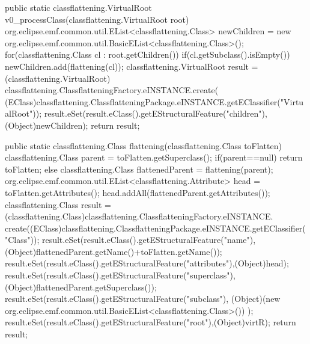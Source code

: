 \begin{codesource2}[label=code:v0flattening,caption=Implémentation de la transformation d'aplatissement de hiérarchie de classes en Java]
public static classflattening.VirtualRoot v0_processClass(classflattening.VirtualRoot root) {
  org.eclipse.emf.common.util.EList<classflattening.Class> newChildren =
    new org.eclipse.emf.common.util.BasicEList<classflattening.Class>();
  for(classflattening.Class cl : root.getChildren()) {
    if(cl.getSubclass().isEmpty()) {
      newChildren.add(flattening(cl));
    }
  }
  classflattening.VirtualRoot result = (classflattening.VirtualRoot)
    classflattening.ClassflatteningFactory.eINSTANCE.create(
        (EClass)classflattening.ClassflatteningPackage.eINSTANCE.getEClassifier("VirtualRoot"));
  result.eSet(result.eClass().getEStructuralFeature("children"),(Object)newChildren);
  return result;
}

public static classflattening.Class flattening(classflattening.Class toFlatten) {
  classflattening.Class parent = toFlatten.getSuperclass();
  if(parent==null) {
    return toFlatten;
  } else {
    classflattening.Class flattenedParent = flattening(parent);
    org.eclipse.emf.common.util.EList<classflattening.Attribute> head =
      toFlatten.getAttributes();
    head.addAll(flattenedParent.getAttributes());
    classflattening.Class result = (classflattening.Class)classflattening.ClassflatteningFactory.eINSTANCE.
      create((EClass)classflattening.ClassflatteningPackage.eINSTANCE.getEClassifier("Class"));
    result.eSet(result.eClass().getEStructuralFeature("name"),(Object)flattenedParent.getName()+toFlatten.getName());
    result.eSet(result.eClass().getEStructuralFeature("attributes"),(Object)head);
    result.eSet(result.eClass().getEStructuralFeature("superclass"),(Object)flattenedParent.getSuperclass());
    result.eSet(result.eClass().getEStructuralFeature("subclass"),
        (Object)(new org.eclipse.emf.common.util.BasicEList<classflattening.Class>()) );
    result.eSet(result.eClass().getEStructuralFeature("root"),(Object)virtR);
    return result;
  }
}
\end{codesource2}
